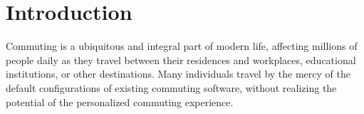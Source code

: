 \chapter{Introduction}\label{ch:introduction}

Commuting is a ubiquitous and integral part of modern life, affecting millions of people daily as they travel between
their residences and workplaces, educational institutions, or other destinations.
Many individuals travel by the mercy of the default configurations of existing commuting software, without realizing the
potential of the personalized commuting experience.
